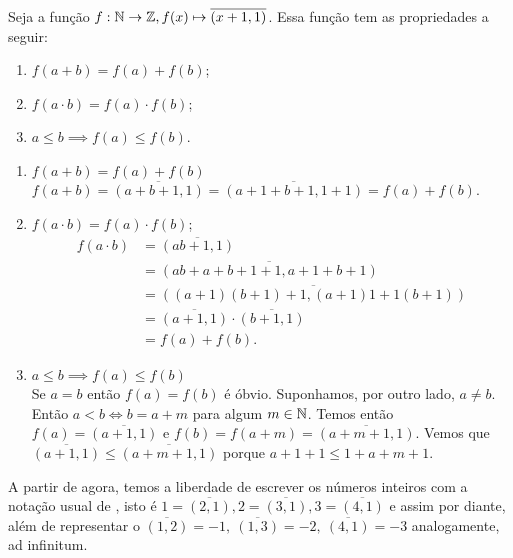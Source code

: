 \documentclass[../main.tex]{subfiles}
\begin{document}
\begin{teo}\label{int-teo-imersao}
    Seja a função $f: \mathbb{N} \rightarrow \mathbb{Z}, f(x) \mapsto \overline{(x+1, 1)}$. Essa função tem as propriedades a seguir:
    \begin{enumerate}[label=(\roman*)]
        \item $f(a + b) = f(a) + f(b)$;
        \item $f(a \cdot b) = f(a) \cdot f(b)$;
        \item $a \leq b \implies f(a) \leq f(b)$.
    \end{enumerate}
\end{teo}
\begin{dem}
    \begin{enumerate}[label=(\roman*)]
        \item $f(a + b) = f(a) + f(b)$\\
        
            $f(a + b) = \overline{(a+b+1, 1)}
                     = \overline{(a+1+b+1, 1+1)} 
                     = f(a) + f(b)$.
        
    
        \item $f(a \cdot b) = f(a) \cdot f(b)$;
        \begin{align*}
            f(a \cdot b) &= \overline{(ab+1, 1)}\\
                        &= \overline{(ab+a+b+1+1, a+1+b+1)}\\
                        &= \overline{((a+1)(b+1)+1, (a+1)1 + 1(b+1))}\\
                        &= \overline{(a+1,1)} \cdot \overline{(b+1,1)}\\
                        &= f(a) + f(b).
        \end{align*}        
        
        \item $a \leq b \implies f(a) \leq f(b)$ \\
        Se $a=b$ então $f(a)=f(b)$ é óbvio. Suponhamos, por outro lado, $a \neq b$.
        Então $a<b \iff b=a+m$ para algum $m \in \mathbb{N}$.
        Temos então $f(a) = \overline{(a+1,1)}$ e $f(b) = f(a+m) = \overline{(a+m+1,1)}$.
        Vemos que $\overline{(a+1,1)} \leq \overline{(a+m+1,1)}$ porque $a+1+1 \leq 1 + a + m + 1$.
    \end{enumerate}
\end{dem}
\begin{obs}
    A partir de agora, temos a liberdade de escrever os números inteiros com a notação usual de \N, isto é $1 = \overline{(2,1)}, 2 = \overline{(3,1)}, 3 = \overline{(4,1)}$ e assim por diante, além de representar o $\overline{(1,2)} = -1,\ \overline{(1,3)} = -2,\ \overline{(4,1)} = -3$ analogamente, ad infinitum.
\end{obs}
\end{document}
